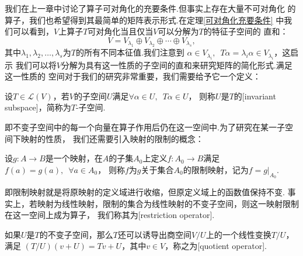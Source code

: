 我们在上一章中讨论了算子可对角化的充要条件.但事实上存在大量不可对角化
的算子，我们也希望得到其最简单的矩阵表示形式.在定理\ref{可对角化充要条件} %
中我们可以看到，$V$上算子$T$可对角化当且仅当$V$可以分解为$T$的特征子空间的
直和：\[V=V_{\lambda_1}\oplus V_{\lambda_2}\oplus\cdots\oplus V_{\lambda_s},\]
其中$\lambda_1,\lambda_2,\ldots,\lambda_s$为$T$的所有不同本征值.我们注意到
$\alpha\in V_{\lambda_i},\enspace T\alpha=\lambda_i\alpha\in V_{\lambda_i}$，这启示
我们可以将$V$分解为具有这一性质的子空间的直和来研究矩阵的简化形式.满足这一性质的
空间对于我们的研究非常重要，我们需要给予它一个定义：
\begin{definition}
    设$T\in \mathcal{L}(V)$，若$V$的子空间$U$满足$\forall \alpha\in U,\enspace T\alpha\in U$，
    则称$U$是$T$的[invariant subspace]，简称为$T$-子空间.
\end{definition}
即不变子空间中的每一个向量在算子作用后仍在这一空间中.为了研究在某一子空间下映射的性质，
我们还需要引入映射的限制的概念：
\begin{definition}
    设$g:A\to B$是一个映射，在$A$的子集$A_0$上定义$f:A_0\to B$满足$f(a)=g(a),\enspace\forall a\in A_0$，
    则称$f$为$g$关于集合$A_0$的限制映射，记为$f=g\vert_{A_0}$.
\end{definition}
即限制映射就是将原映射的定义域进行收缩，但原定义域上的函数值保持不变.
事实上，若映射为线性映射，限制的集合为线性映射的不变子空间，则这一映射限制在这一空间上成为算子，
我们称其为[restriction operator].

如果$U$是$T$的不变子空间，那么$T$还可以诱导出商空间$V/U$上的一个线性变换$T/U$，满足
$(T/U)(v+U)=Tv+U$，其中$v\in V$，称之为[quotient operator].

